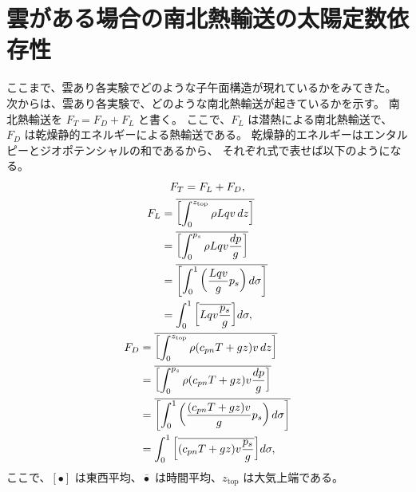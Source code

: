 \documentclass[body]{subfiles}
\begin{document}
\afterpage{\clearpage}

\section{雲がある場合の南北熱輸送の太陽定数依存性}

ここまで、雲あり各実験でどのような子午面構造が現れているかをみてきた。
次からは、雲あり各実験で、どのような南北熱輸送が起きているかを示す。
南北熱輸送を \(F_T=F_D+F_L\) と書く。
ここで、\(F_L\) は潜熱による南北熱輸送で、
\(F_D\) は乾燥静的エネルギーによる熱輸送である。
乾燥静的エネルギーはエンタルピーとジオポテンシャルの和であるから、
それぞれ式で表せば以下のようになる。
\begin{gather}
	F_T=F_L+F_D,\\
	\begin{split}
		F_L&=\overline{\qty[\int^{z_\text{top}}_0 \rho Lqv\,dz]}\\
		&=\overline{\qty[\int^{p_s}_0 \rho Lqv\frac{dp}{g}]}\\
		&=\overline{\qty[\int^1_0 \qty(\frac{Lqv}{g}p_s)\,d\sigma]}\\
		&=\int^1_0 \qty[\overline{Lqv\frac{p_s}{g}}]d\sigma,
	\end{split}\\
	\begin{split}
		F_D&=\overline{\qty[\int^{z_\text{top}}_0 \rho (c_{pn}T+gz)v\,dz]}\\
		&=\overline{\qty[\int^{p_s}_0 \rho (c_{pn}T+gz)v\frac{dp}{g}]}\\
		&=\overline{\qty[\int^1_0 \qty(\frac{(c_{pn}T+gz)v}{g}p_s)\,d\sigma]}\\
		&=\int^1_0 \qty[\overline{(c_{pn}T+gz)v\frac{p_s}{g}}]d\sigma,
	\end{split}
\end{gather}
ここで、\([\bullet]\) は東西平均、\(\bar\bullet\) は時間平均、\(z_\text{top}\) は大気上端である。
\end{document}
